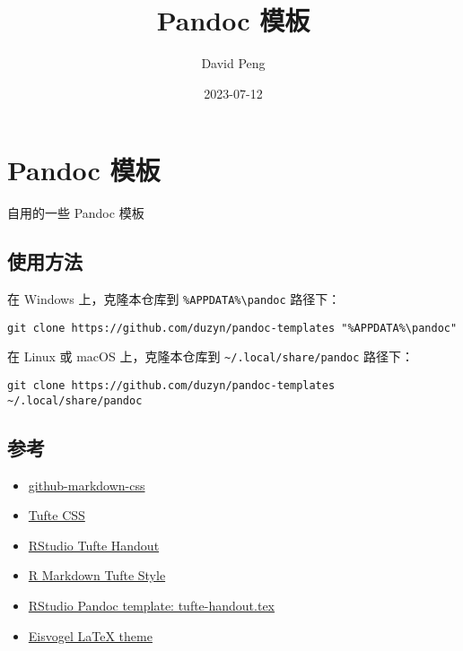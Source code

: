 \documentclass[
  a4paper,
]{article}
\title{Pandoc 模板}
\author{David Peng}
\date{2023-07-12}
\providecommand{\tightlist}{%
  \setlength{\itemsep}{0pt}\setlength{\parskip}{0pt}}
\begin{document}
\maketitle

\hypertarget{pandoc-ux6a21ux677f}{%
\section{Pandoc 模板}\label{pandoc-ux6a21ux677f}}

自用的一些 Pandoc 模板

\hypertarget{ux4f7fux7528ux65b9ux6cd5}{%
\subsection{使用方法}\label{ux4f7fux7528ux65b9ux6cd5}}

在 Windows 上，克隆本仓库到 \texttt{\%APPDATA\%\textbackslash{}pandoc}
路径下：

\begin{verbatim}
git clone https://github.com/duzyn/pandoc-templates "%APPDATA%\pandoc"
\end{verbatim}

在 Linux 或 macOS 上，克隆本仓库到
\texttt{\textasciitilde{}/.local/share/pandoc} 路径下：

\begin{verbatim}
git clone https://github.com/duzyn/pandoc-templates ~/.local/share/pandoc
\end{verbatim}

\hypertarget{ux53c2ux8003}{%
\subsection{参考}\label{ux53c2ux8003}}

\begin{itemize}
\tightlist
\item
  \href{https://github.com/sindresorhus/github-markdown-css}{github-markdown-css}
\item
  \href{https://edwardtufte.github.io/tufte-css/}{Tufte CSS}
\item
  \href{https://rstudio.github.io/tufte/}{RStudio Tufte Handout}
\item
  \href{https://rstudio.github.io/tufte/cn/}{R Markdown Tufte Style}
\item
  \href{https://raw.githubusercontent.com/rstudio/tufte/master/inst/rmarkdown/templates/tufte_handout/resources/tufte-handout.tex}{RStudio
  Pandoc template: tufte-handout.tex}
\item
  \href{https://github.com/Wandmalfarbe/pandoc-latex-template}{Eisvogel
  LaTeX theme}
\end{itemize}
\end{document}
